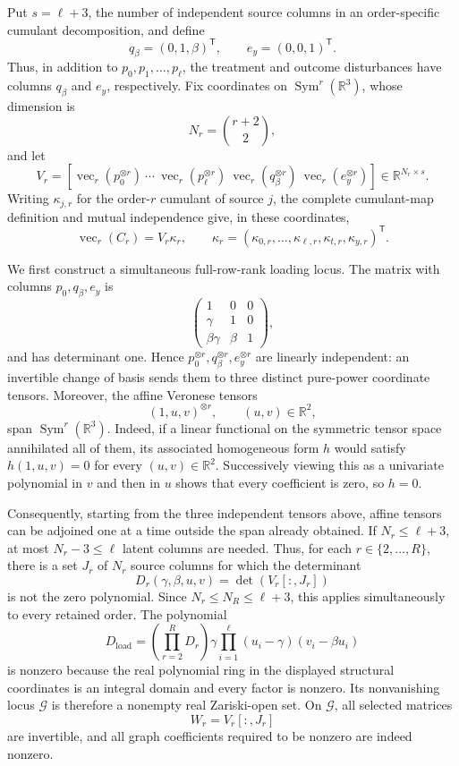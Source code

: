 Put \(s=\ell+3\), the number of independent source columns in an order-specific cumulant decomposition, and define
\[
 q_\beta=(0,1,\beta)^{\mathsf T},\qquad e_y=(0,0,1)^{\mathsf T}.
\]
Thus, in addition to \(p_0,p_1,\ldots,p_\ell\), the treatment and outcome disturbances have columns \(q_\beta\) and \(e_y\), respectively.  Fix coordinates on \(\operatorname{Sym}^r(\mathbb R^3)\), whose dimension is
\[
 N_r=\binom{r+2}{2},
\]
and let
\[
 V_r=\left[\operatorname{vec}_r(p_0^{\otimes r})\ \cdots\ \operatorname{vec}_r(p_\ell^{\otimes r})\ \operatorname{vec}_r(q_\beta^{\otimes r})\ \operatorname{vec}_r(e_y^{\otimes r})\right]\in\mathbb R^{N_r\times s}.
\]
Writing \(\kappa_{j,r}\) for the order-\(r\) cumulant of source \(j\), the complete cumulant-map definition and mutual independence give, in these coordinates,
\[
 \operatorname{vec}_r(C_r)=V_r\kappa_r,
 \qquad
 \kappa_r=(\kappa_{0,r},\ldots,\kappa_{\ell,r},\kappa_{t,r},\kappa_{y,r})^{\mathsf T}.
 \tag{1}
\]

We first construct a simultaneous full-row-rank loading locus.  The matrix with columns \(p_0,q_\beta,e_y\) is
\[
 \begin{pmatrix}
 1&0&0\\
 \gamma&1&0\\
 \beta\gamma&\beta&1
 \end{pmatrix},
\]
and has determinant one.  Hence \(p_0^{\otimes r},q_\beta^{\otimes r},e_y^{\otimes r}\) are linearly independent: an invertible change of basis sends them to three distinct pure-power coordinate tensors.  Moreover, the affine Veronese tensors
\[
 (1,u,v)^{\otimes r},\qquad (u,v)\in\mathbb R^2,
\]
span \(\operatorname{Sym}^r(\mathbb R^3)\).  Indeed, if a linear functional on the symmetric tensor space annihilated all of them, its associated homogeneous form \(h\) would satisfy \(h(1,u,v)=0\) for every \((u,v)\in\mathbb R^2\).  Successively viewing this as a univariate polynomial in \(v\) and then in \(u\) shows that every coefficient is zero, so \(h=0\).

Consequently, starting from the three independent tensors above, affine tensors can be adjoined one at a time outside the span already obtained.  If \(N_r\le \ell+3\), at most \(N_r-3\le\ell\) latent columns are needed.  Thus, for each \(r\in\{2,\ldots,R\}\), there is a set \(J_r\) of \(N_r\) source columns for which the determinant
\[
 D_r(\gamma,\beta,u,v)
 =\det\left(V_r[:,J_r]\right)
 \tag{2}
\]
is not the zero polynomial.  Since \(N_r\le N_R\le\ell+3\), this applies simultaneously to every retained order.  The polynomial
\[
 D_{\mathrm{load}}
 =\left(\prod_{r=2}^R D_r\right)
   \gamma\prod_{i=1}^{\ell}(u_i-\gamma)(v_i-\beta u_i)
 \tag{3}
\]
is nonzero because the real polynomial ring in the displayed structural coordinates is an integral domain and every factor is nonzero.  Its nonvanishing locus \(\mathcal G\) is therefore a nonempty real Zariski-open set.  On \(\mathcal G\), all selected matrices
\[
 W_r=V_r[:,J_r]
 \tag{4}
\]
are invertible, and all graph coefficients required to be nonzero are indeed nonzero.

